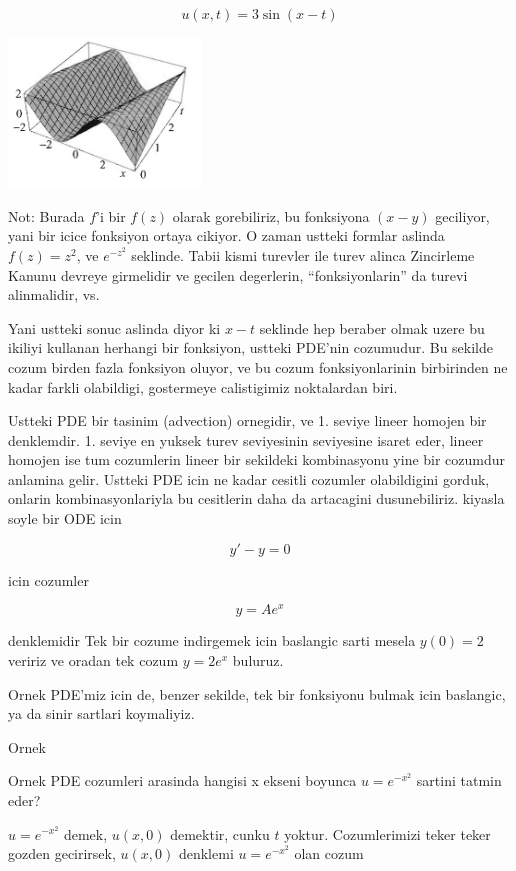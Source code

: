 \documentclass[12pt,fleqn]{article}\usepackage{../common}
\begin{document}
\[ u(x,t) = 3\sin(x-t) \]

\includegraphics[height=4cm]{1_4.png}

Not: Burada $f$'i bir $f(z)$ olarak gorebiliriz, bu fonksiyona $(x-y)$
geciliyor, yani bir icice fonksiyon ortaya cikiyor. O zaman ustteki formlar
aslinda $f(z) = z^2$, ve $e^{-z^2}$ seklinde. Tabii kismi turevler ile
turev alinca Zincirleme Kanunu devreye girmelidir ve gecilen degerlerin,
``fonksiyonlarin'' da turevi alinmalidir, vs. 

Yani ustteki sonuc aslinda diyor ki $x-t$ seklinde hep beraber olmak uzere
bu ikiliyi kullanan herhangi bir fonksiyon, ustteki PDE'nin cozumudur. Bu
sekilde cozum birden fazla fonksiyon oluyor, ve bu cozum fonksiyonlarinin
birbirinden ne kadar farkli olabildigi, gostermeye calistigimiz noktalardan
biri.

Ustteki PDE bir tasinim (advection) ornegidir, ve 1. seviye lineer homojen
bir denklemdir. 1. seviye en yuksek turev seviyesinin seviyesine isaret
eder, lineer homojen ise tum cozumlerin lineer bir sekildeki kombinasyonu
yine bir cozumdur anlamina gelir. Ustteki PDE icin ne kadar cesitli
cozumler olabildigini gorduk, onlarin kombinasyonlariyla bu cesitlerin daha
da artacagini dusunebiliriz. kiyasla soyle bir ODE icin

\[  y' - y  = 0\]

icin cozumler

\[ y = Ae^x \]

denklemidir Tek bir cozume indirgemek icin baslangic sarti mesela $y(0) =2$ 
veririz ve oradan tek cozum $y = 2e^x$ buluruz. 

Ornek PDE'miz icin de, benzer sekilde, tek bir fonksiyonu bulmak icin
baslangic, ya da sinir sartlari koymaliyiz. 

Ornek

Ornek PDE cozumleri arasinda hangisi x ekseni boyunca $u = e^{-x^2}$
sartini tatmin eder? 

$u = e^{-x^2}$ demek, $u(x,0)$ demektir, cunku $t$ yoktur. Cozumlerimizi
teker teker gozden gecirirsek, $u(x,0)$ denklemi $u = e^{-x^2}$ olan
cozum
\end{document}
